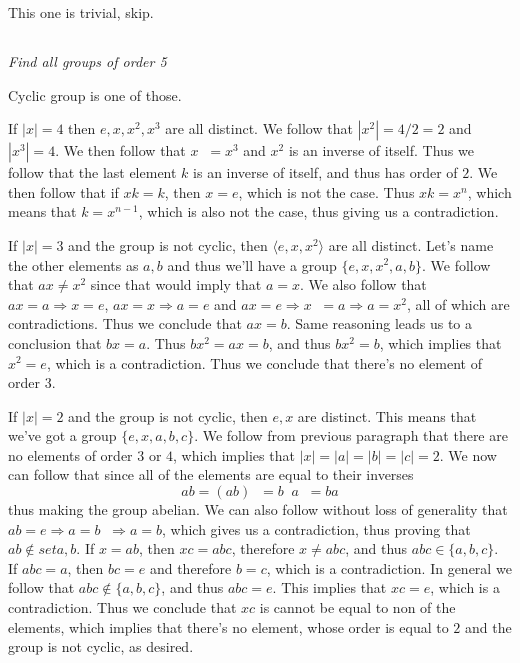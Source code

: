 \documentclass[11pt,oneside,titlepage]{book}
\DeclareMathOperator \inv {^{-1}}
\DeclareMathOperator \ra {\Rightarrow}
\newcommand{\eangle}[1]{\langle #1 \rangle}
\newcommand{\set}[1]{\{ #1 \}}
\begin{document}
This one is trivial, skip.

\subsection{}

\textit{Find all groups of order 5}

Cyclic group is one of those.

If $|x| = 4$ then $e, x, x^2, x^3$ are all distinct. We follow that $|x^2| = 4/2 = 2$ and
$|x^3| = 4$. We then follow that $x\inv = x^3$ and $x^2$ is an inverse of itself. Thus we follow
that the last element $k$ is an inverse of itself, and thus has order of $2$. We then follow that
if $xk = k$, then $x = e$, which is not the case. Thus $xk = x^n$, which means that $k = x^{n - 1}$,
which is also not the case, thus giving us a contradiction.

If $|x| = 3$ and the group is not cyclic, then $\eangle{e, x, x^2}$ are all distinct. Let's name
the other elements as $a, b$ and thus we'll have a group $\set{e, x, x^2, a, b}$.
We follow that $ax \neq x^2$ since that would imply that $a = x$. We also follow that
$ax = a \ra x = e$, $ax = x \ra a = e$ and $ax = e \ra x\inv = a \ra a = x^2$, all of which
are contradictions. Thus we conclude that $ax = b$. Same reasoning leads us to a conclusion
that $bx = a$. Thus $bx^2 = ax = b$, and thus $bx^2 = b$, which implies that $x^2 = e$, which is
a contradiction. Thus we conclude that there's no element of order $3$.

If $|x| = 2$ and the group is not cyclic, then $e, x$ are distinct. This means that
we've got a group $\set{e, x, a, b, c}$. We follow from previous paragraph that there are
no elements of order $3$ or $4$, which implies that $|x| = |a| = |b| = |c| = 2$. We now
can follow that since all of the elements are equal to their inverses
$$ab = (ab)\inv = b\inv a\inv = ba$$
thus making the group abelian. We can also follow without loss of generality that
$ab = e \ra a = b\inv \ra a = b$, which gives us a contradiction, thus proving that
$ab \notin set{a, b}$. If $x = ab$, then $xc = abc$, therefore
$x \neq abc$, and thus $abc \in \set{a, b, c}$. If $abc = a$, then $bc = e$ and therefore $b = c$,
which is a contradiction. In general we follow that $abc \notin \set{a, b, c}$, and thus
$abc = e$. This implies that $xc = e$, which is a contradiction. Thus we conclude that
$xc$ is cannot be equal to non of the elements, which implies that there's no element,
whose order is equal to $2$ and the group is not cyclic, as desired.
\end{document}
